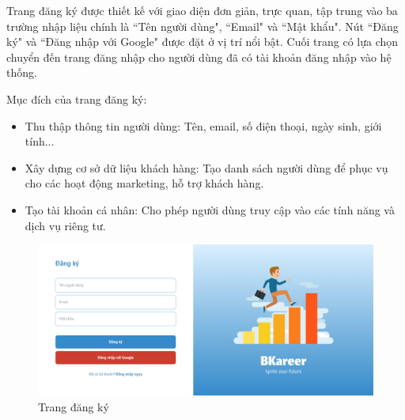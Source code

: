 Trang đăng ký được thiết kế với giao diện đơn giản, trực quan, tập trung vào ba trường nhập liệu chính là ``Tên người dùng", ``Email" và ``Mật khẩu". Nút ``Đăng ký" và ``Đăng nhập với Google" được đặt ở vị trí nổi bật. Cuối trang có lựa chọn chuyển đến trang đăng nhập cho người dùng đã có tài khoản đăng nhập vào hệ thống.

Mục đích của trang đăng ký:
\begin{itemize}
    \item Thu thập thông tin người dùng: Tên, email, số điện thoại, ngày sinh, giới tính...
    \item Xây dựng cơ sở dữ liệu khách hàng: Tạo danh sách người dùng để phục vụ cho các hoạt động marketing, hỗ trợ khách hàng.
    \item Tạo tài khoản cá nhân: Cho phép người dùng truy cập vào các tính năng và dịch vụ riêng tư.
\end{itemize}

\begin{figure}[H]
    \centering
    \includegraphics[width=0.8\linewidth]{images/chap5/register.png}
    \vspace{0.5cm}
    \caption{Trang đăng ký}
\end{figure}

